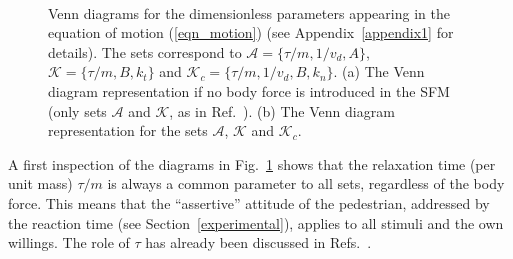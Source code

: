 \documentclass[preprint,12pt]{elsarticle}
\begin{document}
\begin{figure}[!htbp]
\centering
 
\hfill    
{}\\
\caption[width=0.47\columnwidth]{Venn diagrams for the dimensionless parameters
appearing in the equation of motion (\ref{eqn_motion}) (see 
Appendix~\ref{appendix1} for details). The sets correspond to 
$\mathcal{A}=\{\tau/m,1/v_d,A\}$, $\mathcal{K}=\{\tau/m,B,k_t\}$ and 
$\mathcal{K}_c=\{\tau/m,1/v_d,B,k_n\}$. (a) The Venn diagram representation if no 
body force is introduced in the SFM (only sets $\mathcal{A}$ and $\mathcal{K}$, 
as in Ref.~\cite{dorso_2019}). (b) The Venn diagram representation for the sets 
$\mathcal{A}$, $\mathcal{K}$ and $\mathcal{K}_c$. }
\label{venn_diagram}
\end{figure}

A first inspection of the diagrams in Fig.~\ref{venn_diagram} shows that the 
relaxation time (per unit mass) $\tau/m$ is always a common parameter to all 
sets, regardless of the body force. This means that the ``assertive'' attitude 
of the pedestrian, addressed by the reaction time (see 
Section~\ref{experimental}), applies to all stimuli and the own willings. The 
role of $\tau$ has already been discussed in 
Refs.~\cite{johansson_2009,dorso_2019}.    \\ 
\end{document}
